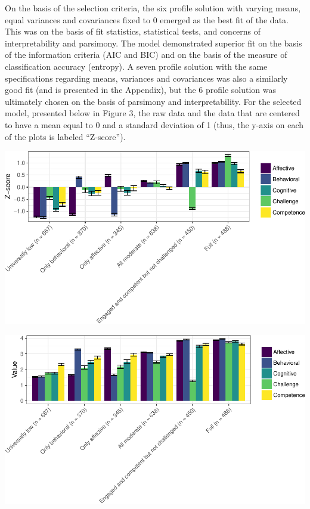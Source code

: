 \documentclass[]{book}
\theoremstyle{definition}
\theoremstyle{definition}
\theoremstyle{definition}
\theoremstyle{remark}
\begin{document}
On the basis of the selection criteria, the six profile solution with
varying means, equal variances and covariances fixed to 0 emerged as the
best fit of the data. This was on the basis of fit statistics,
statistical tests, and concerns of interpretability and parsimony. The
model demonstrated superior fit on the basis of the information criteria
(AIC and BIC) and on the basis of the measure of classification accuracy
(entropy). A seven profile solution with the same specifications
regarding means, variances and covariances was also a similarly good fit
(and is presented in the Appendix), but the 6 profile solution was
ultimately chosen on the basis of parsimony and interpretability. For
the selected model, presented below in Figure 3, the raw data and the
data that are centered to have a mean equal to 0 and a standard
deviation of 1 (thus, the y-axis on each of the plots is labeled
``Z-score'').

\begin{center}\includegraphics[width=1\linewidth]{rosenberg-dissertation_files/figure-latex/unnamed-chunk-10-1} \end{center}

\begin{center}\includegraphics[width=1\linewidth]{rosenberg-dissertation_files/figure-latex/unnamed-chunk-10-2} \end{center}
\end{document}
